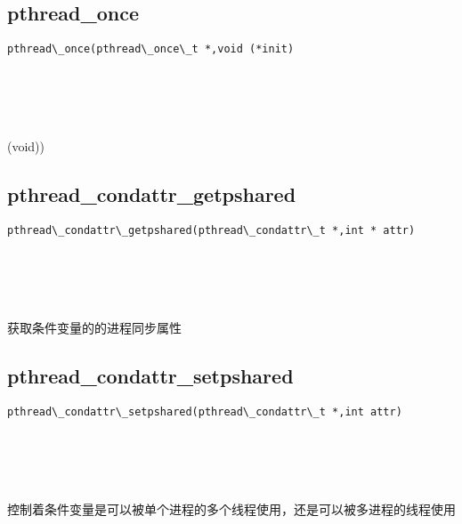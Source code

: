 \documentclass[10pt,a4paper]{article}
\begin{document}
\subsection{pthread\_once}
\begin{spacing}{2.0}
\lstset{language=C,numbers=none}
\begin{lstlisting}
pthread\_once(pthread\_once\_t *,void (*init)
\end{lstlisting}
{\large\color[rgb]{0.2,0.4,0.6}{*:}} \\
{\large\color[rgb]{0.2,0.4,0.6}{(*init:}}
\paragraph{ \ \ }(void))
\end{spacing}

\subsection{pthread\_condattr\_getpshared}
\begin{spacing}{2.0}
\lstset{language=C,numbers=none}
\begin{lstlisting}
pthread\_condattr\_getpshared(pthread\_condattr\_t *,int * attr)
\end{lstlisting}
{\large\color[rgb]{0.2,0.4,0.6}{*:}} \\
{\large\color[rgb]{0.2,0.4,0.6}{attr:}}
\paragraph{ \ \ }获取条件变量的的进程同步属性
\end{spacing}

\subsection{pthread\_condattr\_setpshared}
\begin{spacing}{2.0}
\lstset{language=C,numbers=none}
\begin{lstlisting}
pthread\_condattr\_setpshared(pthread\_condattr\_t *,int attr)
\end{lstlisting}
{\large\color[rgb]{0.2,0.4,0.6}{*:}} \\
{\large\color[rgb]{0.2,0.4,0.6}{attr:}}
\paragraph{ \ \ }控制着条件变量是可以被单个进程的多个线程使用，还是可以被多进程的线程使用
\end{spacing}
\end{document}
